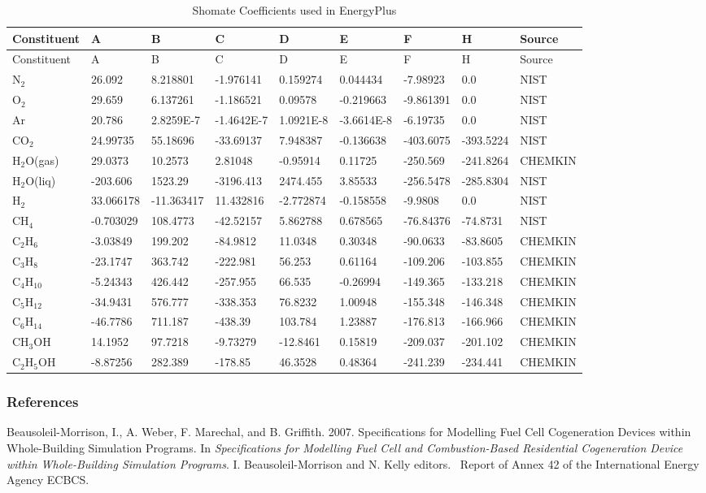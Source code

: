 {\scriptsize
\begin{longtable}[c]{p{0.6in}p{0.6in}p{0.6in}p{0.6in}p{0.6in}p{0.6in}p{0.6in}p{0.6in}p{0.6in}}
\caption{Shomate Coefficients used in EnergyPlus \label{table:shomate-coefficients}} \tabularnewline
\toprule
Constituent & A & B & C & D & E & F & H & Source \tabularnewline
\midrule
\endfirsthead

\toprule
Constituent & A & B & C & D & E & F & H & Source \tabularnewline
\midrule
\endhead

N\(_{2}\) & 26.092 & 8.218801 & -1.976141 & 0.159274 & 0.044434 & -7.98923 & 0.0 & NIST \tabularnewline
O\(_{2}\) & 29.659 & 6.137261 & -1.186521 & 0.09578 & -0.219663 & -9.861391 & 0.0 & NIST \tabularnewline
Ar & 20.786 & 2.8259E-7 & -1.4642E-7 & 1.0921E-8 & -3.6614E-8 & -6.19735 & 0.0 & NIST \tabularnewline
CO\(_{2}\) & 24.99735 & 55.18696 & -33.69137 & 7.948387 & -0.136638 & -403.6075 & -393.5224 & NIST \tabularnewline
H\(_{2}\)O(gas) & 29.0373 & 10.2573 & 2.81048 & -0.95914 & 0.11725 & -250.569 & -241.8264 & CHEMKIN \tabularnewline
H\(_{2}\)O(liq) & -203.606 & 1523.29 & -3196.413 & 2474.455 & 3.85533 & -256.5478 & -285.8304 & NIST \tabularnewline
H\(_{2}\) & 33.066178 & -11.363417 & 11.432816 & -2.772874 & -0.158558 & -9.9808 & 0.0 & NIST \tabularnewline
CH\(_{4}\) & -0.703029 & 108.4773 & -42.52157 & 5.862788 & 0.678565 & -76.84376 & -74.8731 & NIST \tabularnewline
C\(_{2}\)H\(_{6}\) & -3.03849 & 199.202 & -84.9812 & 11.0348 & 0.30348 & -90.0633 & -83.8605 & CHEMKIN \tabularnewline
C\(_{3}\)H\(_{8}\) & -23.1747 & 363.742 & -222.981 & 56.253 & 0.61164 & -109.206 & -103.855 & CHEMKIN \tabularnewline
C\(_{4}\)H\(_{10}\) & -5.24343 & 426.442 & -257.955 & 66.535 & -0.26994 & -149.365 & -133.218 & CHEMKIN \tabularnewline
C\(_{5}\)H\(_{12}\) & -34.9431 & 576.777 & -338.353 & 76.8232 & 1.00948 & -155.348 & -146.348 & CHEMKIN \tabularnewline
C\(_{6}\)H\(_{14}\) & -46.7786 & 711.187 & -438.39 & 103.784 & 1.23887 & -176.813 & -166.966 & CHEMKIN \tabularnewline
CH\(_{3}\)OH & 14.1952 & 97.7218 & -9.73279 & -12.8461 & 0.15819 & -209.037 & -201.102 & CHEMKIN \tabularnewline
C\(_{2}\)H\(_{5}\)OH & -8.87256 & 282.389 & -178.85 & 46.3528 & 0.48364 & -241.239 & -234.441 & CHEMKIN \tabularnewline
\bottomrule
\end{longtable}}

\subsubsection{References}\label{references-2-005}

Beausoleil-Morrison, I., A. Weber, F. Marechal, and B. Griffith. 2007. Specifications for Modelling Fuel Cell Cogeneration Devices within Whole-Building Simulation Programs. In \emph{Specifications for Modelling Fuel Cell and Combustion-Based Residential Cogeneration Device within Whole-Building Simulation Programs}. I. Beausoleil-Morrison and N. Kelly editors.~ Report of Annex 42 of the International Energy Agency ECBCS.


